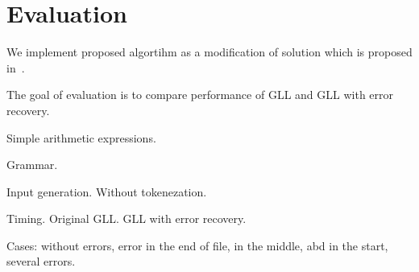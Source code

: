 \section{Evaluation}
\label{sec:evaluation}

We implement proposed algortihm as a modification of solution which is proposed in~\cite{!!!}.

The goal of evaluation is to compare performance of GLL and GLL with error recovery.

Simple arithmetic expressions.

Grammar.

Input generation. Without tokenezation.

Timing. Original GLL. GLL with error recovery.

Cases: without errors, error in the end of file, in the middle, abd in the start, several errors.
